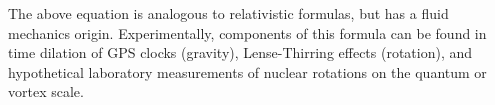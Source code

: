 The above equation is analogous to relativistic formulas, but has a fluid mechanics origin. Experimentally, components of this formula can be found in time dilation of GPS clocks (gravity), Lense-Thirring effects (rotation), and hypothetical laboratory measurements of nuclear rotations on the quantum or vortex scale.